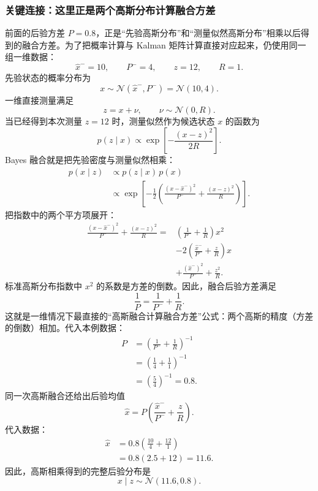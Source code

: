 \documentclass[UTF8,a4paper,11pt]{ctexart}
\newcommand{\prior}{^{-}}
\begin{document}
\subsubsection*{关键连接：这里正是两个高斯分布计算融合方差}

前面的后验方差 $P=0.8$，正是“先验高斯分布”和“测量似然高斯分布”相乘以后得到的融合方差。为了把概率计算与 Kalman 矩阵计算直接对应起来，仍使用同一组一维数据：
\begin{equation}
\hat x\prior=10,\qquad
P\prior=4,\qquad
z=12,\qquad
R=1.
\end{equation}
先验状态的概率分布为
\begin{equation}
x\sim\mathcal N(\hat x\prior,P\prior)
=\mathcal N(10,4).
\end{equation}
一维直接测量满足
\begin{equation}
z=x+\nu,\qquad \nu\sim\mathcal N(0,R).
\end{equation}
当已经得到本次测量 $z=12$ 时，测量似然作为候选状态 $x$ 的函数为
\begin{equation}
p(z\mid x)
\propto
\exp\!\left[-\frac{(x-z)^2}{2R}\right].
\end{equation}
Bayes 融合就是把先验密度与测量似然相乘：
\begin{align}
p(x\mid z)
&\propto p(z\mid x)\,p(x)\\
&\propto
\exp\!\left[
-\frac{1}{2}
\left(
\frac{(x-\hat x\prior)^2}{P\prior}
+\frac{(x-z)^2}{R}
\right)
\right].
\end{align}
把指数中的两个平方项展开：
\begin{align}
\frac{(x-\hat x\prior)^2}{P\prior}
+\frac{(x-z)^2}{R}
={}&
\left(\frac{1}{P\prior}+\frac{1}{R}\right)x^2\\
&-2\left(
\frac{\hat x\prior}{P\prior}
+\frac{z}{R}
\right)x\\
&+\frac{(\hat x\prior)^2}{P\prior}
+\frac{z^2}{R}.
\end{align}
标准高斯分布指数中 $x^2$ 的系数是方差的倒数。因此，融合后验方差满足
\begin{equation}
\boxed{
\frac{1}{P}
=
\frac{1}{P\prior}
+\frac{1}{R}
}.
\end{equation}
这就是一维情况下最直接的“高斯融合计算融合方差”公式：两个高斯的精度（方差的倒数）相加。代入本例数据：
\begin{align}
P
&=\left(\frac{1}{P\prior}+\frac{1}{R}\right)^{-1}\\
&=\left(\frac{1}{4}+\frac{1}{1}\right)^{-1}\\
&=\left(\frac{5}{4}\right)^{-1}
=\boxed{0.8}.
\end{align}
同一次高斯融合还给出后验均值
\begin{equation}
\hat x
=P\left(
\frac{\hat x\prior}{P\prior}
+\frac{z}{R}
\right).
\end{equation}
代入数据：
\begin{align}
\hat x
&=0.8\left(\frac{10}{4}+\frac{12}{1}\right)\\
&=0.8(2.5+12)
=\boxed{11.6}.
\end{align}
因此，高斯相乘得到的完整后验分布是
\begin{equation}
\boxed{x\mid z\sim\mathcal N(11.6,0.8)}.
\end{equation}
\end{document}
